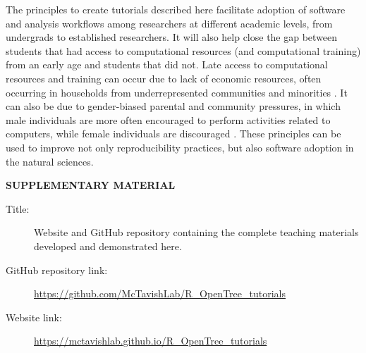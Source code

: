 \documentclass[12pt]{article}
\begin{document}
The principles to create tutorials described here facilitate adoption of software
and analysis workflows among researchers at different academic levels, from undergrads
to established researchers.
It will also help close the gap between students that had access to computational
resources (and computational training) from an early age and students that did not.
Late access to computational resources and training can occur due to lack of
economic resources, often occurring in households from underrepresented communities
and minorities \citep{google2016diversity, warner2021quantifying}.
It can also be due to gender-biased parental and community pressures,
in which male individuals are more often encouraged to perform activities related to computers,
while female individuals are discouraged \citep{warner2021quantifying}.
These principles can be used to improve not only reproducibility practices,
but also software adoption in the natural sciences.


\bigskip
\begin{center}
{\large\bf SUPPLEMENTARY MATERIAL}
\end{center}

\begin{description}

\item[Title:] Website and GitHub repository containing the complete teaching materials developed and demonstrated here.

\item[GitHub repository link:] \url{https://github.com/McTavishLab/R_OpenTree_tutorials}

\item[Website link:] \url{https://mctavishlab.github.io/R_OpenTree_tutorials}

\end{description}


\end{document}
